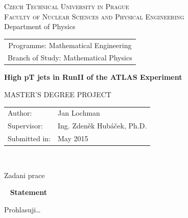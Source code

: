 \documentclass[a4paper,11pt]{report}
\newcommand{\cvut}{Czech Technical University in Prague}
\newcommand{\fjfi}{Faculty of Nuclear Sciences and Physical Engineering}
\newcommand{\km}{Department of Physics}
\newcommand{\obor}{Mathematical Engineering}
\newcommand{\zamereni}{Mathematical Physics}
\newcommand{\nazeven}{High pT jets in RunII of the ATLAS Experiment}
\newcommand{\autor}{Jan Lochman}
\newcommand{\rok}{May 2015}
\newcommand{\vedouci}{Ing. Zden\v{e}k Hub\'{a}\v{c}ek, Ph.D.}
\begin{document}
\thispagestyle{empty}

\begin{center}
    {\Large \textsc{\cvut}\\[1.5ex] \textsc{\fjfi}}\\[1.5ex]{\large \textsc \km}
    \vspace{10mm}

    \begin{tabular}{c}
    {Programme: \obor}\\
    {Branch of Study: \zamereni}
    \end{tabular}

    \vspace{10mm} \epsfysize=25mm  \epsfysize=25mm  \vspace{15mm}

   {\huge \bf \nazeven}

   \vspace{15mm}
   {\Large MASTER'S DEGREE PROJECT}

   \vfill
   {\large
    \begin{tabular}{ll}
    Author: & \autor\\
    Supervisor: & \vedouci\\
    Submitted in: & \rok
    \end{tabular}
   }
\end{center}


\newpage  
\thispagestyle{empty} 
~


\newpage  
\thispagestyle{empty} 
Zadani prace


\newpage 
\thispagestyle{empty}  
~
\vfill 
{\bf Statement} 

\vspace{0.5cm} 
Prohlasuji\ldots
\end{document}
